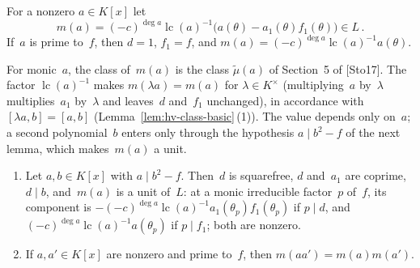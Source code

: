 \begin{definition}
\label{def:ds-value}
\leanok
For a nonzero $a \in K[x]$ let
\[ m(a) = (-c)^{\deg a}\operatorname{lc}(a)^{-1}\bigl(a(\theta) - a_1(\theta) f_1(\theta)\bigr)
   \in L\,. \]
If~$a$ is prime to~$f$, then $d = 1$, $f_1 = f$, and
$m(a) = (-c)^{\deg a}\operatorname{lc}(a)^{-1} a(\theta)$.
\end{definition}

For monic~$a$, the class of~$m(a)$ is the class $\tilde\mu(a)$ of Section~5 of [Sto17]. The factor
$\operatorname{lc}(a)^{-1}$ makes $m(\lambda a) = m(a)$ for $\lambda \in K^\times$ (multiplying~$a$
by~$\lambda$ multiplies~$a_1$ by~$\lambda$ and leaves~$d$ and~$f_1$ unchanged), in accordance with
$[\lambda a, b] = [a, b]$ (Lemma~\ref{lem:hv-class-basic}\,(1)). The value depends only on~$a$; a
second polynomial~$b$ enters only through the hypothesis $a \mid b^2 - f$ of the next lemma, which
makes~$m(a)$ a unit.

\begin{lemma}
\label{lem:ds-value}
\leanok
{}
\begin{enumerate}
  \item Let $a, b \in K[x]$ with $a \mid b^2 - f$. Then~$d$ is squarefree, $d$ and~$a_1$ are
    coprime, $d \mid b$, and~$m(a)$ is a unit of~$L$: at a monic irreducible factor~$p$ of~$f$,
    its component is $-(-c)^{\deg a}\operatorname{lc}(a)^{-1}a_1(\theta_p)f_1(\theta_p)$ if
    $p \mid d$, and $(-c)^{\deg a}\operatorname{lc}(a)^{-1}a(\theta_p)$ if $p \mid f_1$; both are
    nonzero.
  \item If $a, a' \in K[x]$ are nonzero and prime to~$f$, then $m(aa') = m(a)m(a')$.
\end{enumerate}
\end{lemma}

